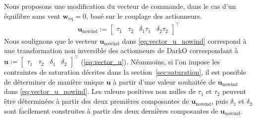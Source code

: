         Nous proposons une modification du vecteur de commande, dans le cas d'un équilibre sans vent $\boldsymbol{w}_{\mathrm{eq}} = 0$, basé sur le couplage des actionneurs. 
        \begin{align}
            \label{eq:vector_u_nowind}
            \boldsymbol{u}_{\text{nowind}} := \begin{bmatrix}\tau_{1}  \!&\! \tau_{2}  \!&\! \delta_{1}\tau_{1} \!&\! \delta_{2}\tau_{2} \end{bmatrix}^\top
        \end{align}
        Nous soulignons que le vecteur $\boldsymbol{u}_{\text{nowind}}$ dans \eqref{eq:vector_u_nowind} correspond à une transformation non inversible des actionneurs de DarkO correspondant à $\boldsymbol{u} := \begin{bmatrix}\tau_{1}  \!&\! \tau_{2}  \!&\! \delta_{1} \!&\! \delta_{2} \end{bmatrix}^\top$ (\eqref{eq:vector_u}). Néanmoins, si l'on impose les contraintes de saturation décrites dans la section~\ref{sec:saturation}, il est possible de déterminer de manière unique $\boldsymbol{u}$ à partir d'une valeur souhaitée de $\boldsymbol{u}_{\text{nowind}}$ dans \eqref{eq:vector_u_nowind}. Les valeurs positives non nulles de $\tau_{1}$ et $\tau_{2}$ peuvent être déterminées à partir des deux premières composantes de $\boldsymbol{u}_{\text{nowind}}$, puis $\delta_1$ et $\delta_2$ sont facilement construites à partir des deux dernières composantes de $\boldsymbol{u}_{\text{nowind}}$. 

